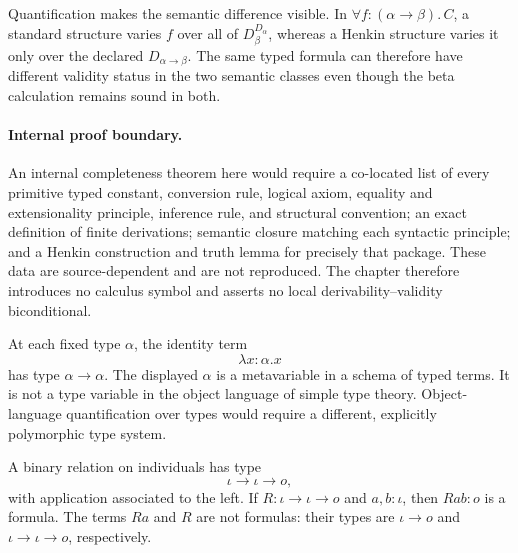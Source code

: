 Quantification makes the semantic difference visible.  In
\(\forall f{:}(\alpha\to\beta).\,C\), a standard structure varies \(f\) over
all of \(D_\beta^{D_\alpha}\), whereas a Henkin structure varies it only over
the declared \(D_{\alpha\to\beta}\).  The same typed formula can therefore
have different validity status in the two semantic classes even though the
beta calculation remains sound in both.

\paragraph{Internal proof boundary.}
An internal completeness theorem here would require a co-located list of every
primitive typed constant, conversion rule, logical axiom, equality and
extensionality principle, inference rule, and structural convention; an exact
definition of finite derivations; semantic closure matching each syntactic
principle; and a Henkin construction and truth lemma for precisely that
package.  These data are source-dependent and are not reproduced.  The chapter
therefore introduces no calculus symbol and asserts no local
derivability--validity biconditional.

\begin{example}
At each fixed type \(\alpha\), the identity term
\[
  \lambda x{:}\alpha.x
\]
has type \(\alpha\to\alpha\).  The displayed \(\alpha\) is a metavariable in a
schema of typed terms.  It is not a type variable in the object language of
simple type theory.  Object-language quantification over types would require a
different, explicitly polymorphic type system.
\end{example}

\begin{example}
A binary relation on individuals has type
\[
  \iota\to\iota\to o,
\]
with application associated to the left.  If
\(R:\iota\to\iota\to o\) and \(a,b:\iota\), then \(Rab:o\) is a formula.
The terms \(Ra\) and \(R\) are not formulas: their types are
\(\iota\to o\) and \(\iota\to\iota\to o\), respectively.
\end{example}

